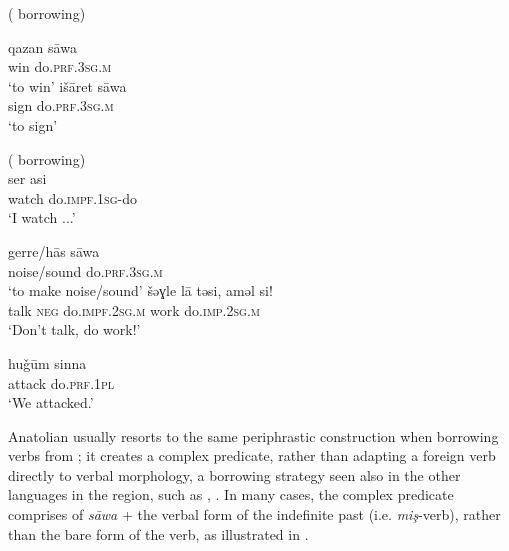 \documentclass[output=paper]{langsci/langscibook}
\begin{document}
\begin{exe}
\ex \label{l}   ( borrowing)
{\multicolsep=0pt\begin{multicols}{2}\raggedcolumns
		\begin{xlist}
			\ex \label{ltk2} \gll qazan 	s\={a}wa  \\
        win	do.\textsc{prf.3sg.m}\\
        \glt `to win'\columnbreak
		\ex \label{ltk1}\gll išāret s\={a}wa \\
    sign  do.\textsc{prf.3sg.m}\\
        \glt `to sign'
		\end{xlist}
		\end{multicols}}
      \ex \label{l3}   ( borrowing) \\
      \gll ser asi \\
        watch do.\textsc{impf.1sg}-do\\
        \glt `I watch ...'\pagebreak
        \ex \label{lar}   \\
		\begin{xlist}
		\ex \gll gerre/h\={a}s s\={a}wa\\
    noise/sound do.\textsc{prf.3sg.m}\\
        \glt `to make noise/sound'
	\ex \label{lar2} \gll šəɣle l\={a} təsi, aməl si!  \\
      talk \textsc{neg} do.\textsc{impf.2sg.m} work do.\textsc{imp.2sg.m}\\
        \glt `Don't talk, do work!'

        \ex \label{lar3}\gll hu\v{g}ūm sinna \\
    attack  do.\textsc{prf.1pl}\\
        \glt `We attacked.'
		\end{xlist}
\end{exe}

\noindent Anatolian  usually resorts to the same periphrastic construction when borrowing verbs from ; it creates a complex predicate, rather than adapting a foreign verb directly to  verbal morphology, a borrowing strategy seen also in the other languages in the region, such as , . In many cases, the complex predicate comprises of \textit{s\={a}wa} + the  verbal form of the indefinite past (i.e. \textit{mi\c{s}}-verb), rather than the bare form of the verb, as illustrated in .
\end{document}
